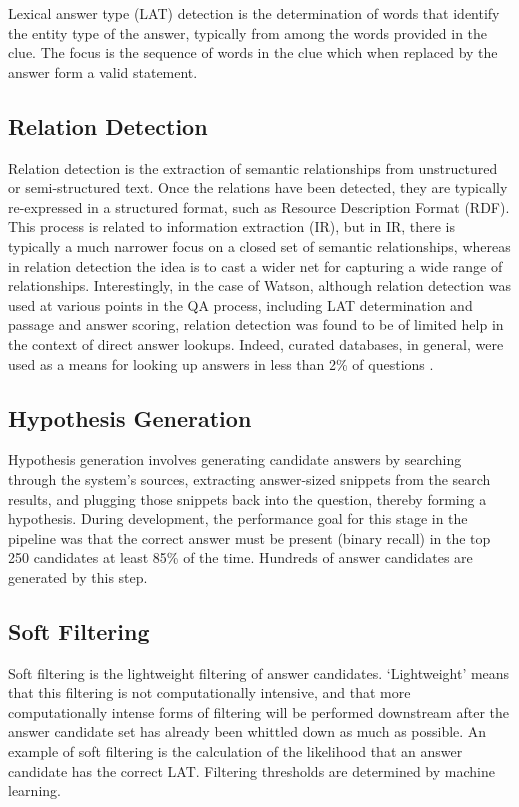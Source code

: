 Lexical answer type (LAT) detection is the determination of words that identify the entity type of the answer, typically from among the words provided in the clue.  The focus is the sequence of words in the clue which when replaced by the answer form a valid statement.

\subsection{Relation Detection}

Relation detection is the extraction of semantic relationships from unstructured or semi-structured text.   Once the relations have been detected, they are typically re-expressed in a structured format, such as Resource Description Format (RDF).  This process is related to information extraction (IR), but in IR, there is typically a much narrower focus on a closed set of semantic relationships, whereas in relation detection the idea is to cast a wider net for capturing a wide range of relationships.  Interestingly, in the case of Watson, although relation detection was used at various points in the QA process, including LAT determination and passage and answer scoring, relation detection was found to be of limited help in the context of direct answer lookups.  Indeed, curated databases, in general, were used as a means for looking up answers in less than 2\% of questions \cite{ferrucci2010building}.

\subsection{Hypothesis Generation}

Hypothesis generation involves generating candidate answers by searching through the system's sources, extracting answer-sized snippets from the search results, and plugging those snippets back into the question, thereby forming a hypothesis.  During development, the performance goal for this stage in the pipeline was that the correct answer must be present (binary recall) in the top 250 candidates at least 85\% of the time.  Hundreds of answer candidates are generated by this step.

\subsection{Soft Filtering}

Soft filtering is the lightweight filtering of answer candidates.  `Lightweight' means that this filtering is not computationally intensive, and that more computationally intense forms of filtering will be performed downstream after the answer candidate set has already been whittled down as much as possible.  An example of soft filtering is the calculation of the likelihood that an answer candidate has the correct LAT.  Filtering thresholds are determined by machine learning.

